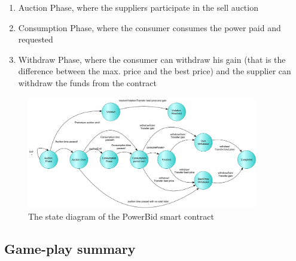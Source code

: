 \documentclass[a4paper]{article}
\begin{document}
\begin{enumerate}
    \item Auction Phase, where the suppliers participate in the sell auction
    \item Consumption Phase, where the consumer consumes the power paid and requested
    \item Withdraw Phase, where the consumer can withdraw his gain (that is the difference between the max. price and the best price) and the supplier can withdraw the funds from the contract
\end{enumerate}


\begin{figure}[H]
    \centering
    \includegraphics[width=0.9\textwidth]{figures/state_diagram.png}
    \caption{The state diagram of the PowerBid smart contract}
    \label{fig:State-diagram-powerbid}
\end{figure}

\subsection{Game-play summary}
\end{document}

